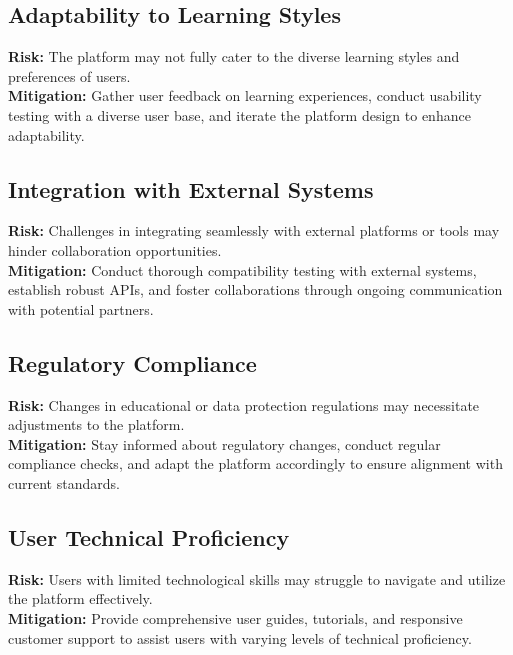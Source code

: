 \subsection{Adaptability to Learning Styles}
\textbf{Risk:} The platform may not fully cater to the diverse learning styles and preferences of users. \\
\textbf{Mitigation:} Gather user feedback on learning experiences, conduct usability testing with a diverse user base, and iterate the platform design to enhance adaptability.

\subsection{Integration with External Systems}
\textbf{Risk:} Challenges in integrating seamlessly with external platforms or tools may hinder collaboration opportunities. \\
\textbf{Mitigation:} Conduct thorough compatibility testing with external systems, establish robust APIs, and foster collaborations through ongoing communication with potential partners.

\subsection{Regulatory Compliance}
\textbf{Risk:} Changes in educational or data protection regulations may necessitate adjustments to the platform. \\
\textbf{Mitigation:} Stay informed about regulatory changes, conduct regular compliance checks, and adapt the platform accordingly to ensure alignment with current standards.

\subsection{User Technical Proficiency}
\textbf{Risk:} Users with limited technological skills may struggle to navigate and utilize the platform effectively. \\
\textbf{Mitigation:} Provide comprehensive user guides, tutorials, and responsive customer support to assist users with varying levels of technical proficiency.


